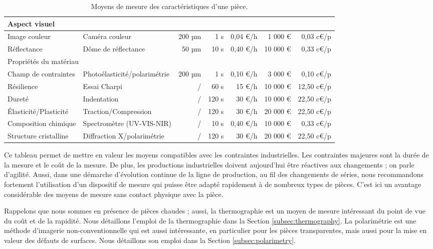 \begin{table}[htpb]
\begin{tabular}{|l|l|r|r|r|r|r|}
		\hline
		\multicolumn{7}{|l|}{Aspect visuel} \\ \hline
		Image couleur & Caméra couleur & 200 µm & 1 s & 0,04 €/h & 1 000 € & 0,03 c€/p \\ \hline
		Réflectance & Dôme de réflectance & 50 µm & 10 s & 0,40 €/h & 10 000 € & 0,33 c€/p \\ \hline
		\hline
		\multicolumn{7}{|l|}{Propriétés du matériau} \\ \hline
		Champ de contraintes & Photoélasticité/polarimétrie & 200 µm & 1 s & 0,10 €/h & 3 000 € & 0,10 c€/p \\ \hline
		Résilience & Essai Charpi & / & 60 s & 15 €/h & 10 000 € & 12,50 c€/p \\ \hline
		Dureté & Indentation & / & 120 s & 30 €/h & 10 000 € & 22,50 c€/p \\ \hline
		Élasticité/Plasticité & Traction/Compression & / & 120 s & 30 €/h & 20 000 € & 22,50 c€/p \\ \hline
		Composition chimique & Spectromètre (UV-VIS-NIR) & / & 10 s & 0,40 €/h & 10 000 € & 0,33 c€/p \\ \hline
		Structure cristalline & Diffraction X/polarimétrie & / & 120 s & 30 €/h & 20 000 € & 22,50 c€/p \\ \hline
	\end{tabular}
	\caption{Moyens de mesure des caractéristiques d'une pièce.}
	\label{tab:product_measurements}
\end{table}

Ce tableau permet de mettre en valeur les moyens compatibles avec les contraintes industrielles.
Les contraintes majeures sont la durée de la mesure et le coût de la mesure.
De plus, les productions industrielles doivent aujourd'hui être réactives aux changements ; on parle d'agilité.
Aussi, dans une démarche d'évolution continue de la ligne de production, au fil des changements de séries, nous recommandons fortement l'utilisation d'un dispositif de mesure qui puisse être adapté rapidement à de nombreux types de pièces.
C'est ici un avantage considérable des moyens de mesure sans contact physique avec la pièce.

Rappelons que nous sommes en présence de pièces chaudes ; aussi, la thermographie est un moyen de mesure intéressant du point de vue du coût et de la rapidité.
Nous détaillons l'emploi de la thermographie dans la Section \ref{subsec:thermography}.
La polarimétrie est une méthode d'imagerie non-conventionnelle qui est aussi intéressante, en particulier pour les pièces transparentes, mais aussi pour la mise en valeur des défauts de surfaces.
Nous détaillons son emploi dans la Section \ref{subsec:polarimetry}.

